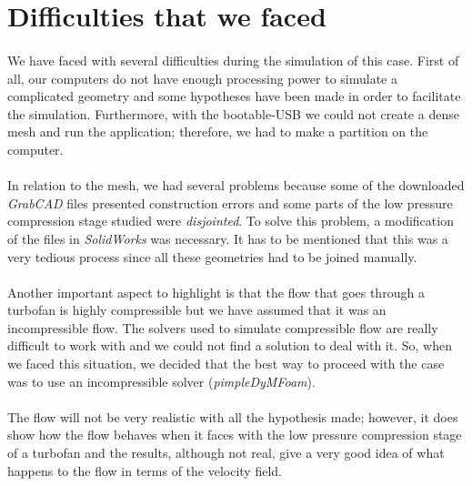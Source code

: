 \section{Difficulties that we faced}

\paragraph{}We have faced with several difficulties during the simulation of this case. First of all, our computers do not have enough processing power to simulate a complicated geometry and some hypotheses have been made in order to facilitate the simulation. Furthermore, with the bootable-USB we could not create a dense mesh and run the application; therefore, we had to make a partition on the computer.

\paragraph{}In relation to the mesh, we had several problems because some of the downloaded \textit{GrabCAD} files presented construction errors and some parts of the low pressure compression stage studied were \textit{disjointed}. To solve this problem, a modification of the files in \textit{SolidWorks} was necessary. It has to be mentioned that this was a very tedious process since all these geometries had to be joined manually.

\paragraph{}Another important aspect to highlight is that the flow that goes through a turbofan is highly compressible but we have assumed that it was an incompressible flow. The solvers used to simulate compressible flow are really difficult to work with and we could not find a solution to deal with it. So, when we faced this situation, we decided that the best way to proceed with the case was to use an incompressible solver (\textit{pimpleDyMFoam}).

\paragraph{}The flow will not be very realistic with all the hypothesis made; however, it does show how the flow behaves when it faces with the low pressure compression stage of a turbofan and the results, although not real, give a very good idea of what happens to the flow in terms of the velocity field.